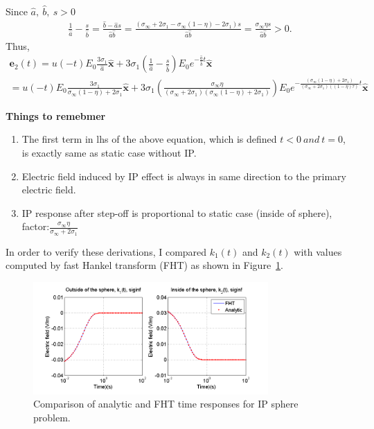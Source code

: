 \documentclass[a4paper, 11pt]{article}
\begin{document}
Since $\hat{a},\ \hat{b},\ s>0$
\begin{align*}
	\frac{1}{\hat{a}}-\frac{s}{\hat{b}} = \frac{\hat{b}-\hat{a}s}{\hat{a}\hat{b}} 
	= \frac{(\sigma_{\infty}+2\sigma_1-\sigma_{\infty}(1-\eta)-2\sigma_1)s}{\hat{a}\hat{b}} 
	= \frac{\sigma_{\infty}\eta s}{\hat{a}\hat{b}} > 0.
\end{align*}
Thus, 
\begin{align}
	\mathbf{e}_2(t) = u(-t)E_0\frac{3\sigma_1}{\hat{a}}\mathbf{\hat{x}} 
	                + 3\sigma_1(\frac{1}{\hat{a}}-\frac{s}{\hat{b}})E_0e^{-\frac{\hat{a}}{\hat{b}}t}\mathbf{\hat{x}} \nonumber \\
	                = u(-t)E_0\frac{3\sigma_1}{\sigma_{\infty}(1-\eta) + 2\sigma_1}\mathbf{\hat{x}} 
	                + 3\sigma_1(\frac{\sigma_{\infty}\eta}{(\sigma_{\infty}+2\sigma_1)(\sigma_{\infty}(1-\eta)+2\sigma_1)})
	                  E_0e^{-\frac{(\sigma_{\infty}(1-\eta)+2\sigma_1)}{(\sigma_{\infty} + 2\sigma_1)((1-\eta)\tau)}t}\mathbf{\hat{x}}
	\label{eq:IPspheq6}		
\end{align}

\textbf{Things to remebmer}
\begin{enumerate}
	\item The first term in lhs of the above equation, which is defined $t<0 \ and \ t=0$, is exactly same as static case without IP. 
	\item Electric field induced by IP effect is always in same direction to the primary electric field. 
	\item IP response after step-off is proportional to static case (inside of sphere), factor:$\frac{\sigma_{\infty}\eta}{\sigma_{\infty}+2\sigma_1}$
\end{enumerate}

In order to verify these derivations, I compared $k_1(t)$ and $k_2(t)$ with values computed by fast Hankel transform (FHT) as shown in Figure~\ref{F:IPsphereVeri}. 
\begin{figure}[htb]
	\centering
	\includegraphics[width=0.8\textwidth]{IPsphereVeri.png}
	\caption{Comparison of analytic and FHT time responses for IP sphere problem.}
	\label{F:IPsphereVeri}
\end{figure}
\clearpage
\end{document}
